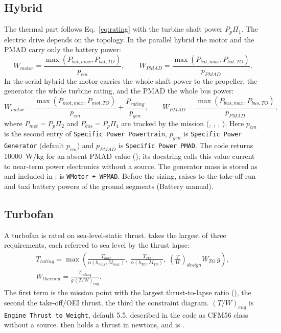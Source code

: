 \documentclass[a4paper,11pt]{article}
\begin{document}
\subsection{Hybrid}
The thermal part follows Eq.~\eqref{eq:rating} with the turbine shaft power $P_p\Pi_1$. The
electric drive depends on the topology. In the parallel hybrid the motor and the PMAD carry
only the battery power:
\begin{equation}
  W_{motor} = \frac{\max(P_{bat,max}, P_{bat,TO})}{p_{em}},\qquad
  W_{PMAD} = \frac{\max(P_{bat,max}, P_{bat,TO})}{p_{PMAD}} .
\end{equation}
In the serial hybrid the motor carries the whole shaft power to the propeller, the generator
the whole turbine rating, and the PMAD the whole bus power:
\begin{equation}
  W_{motor} = \frac{\max(P_{mot,max}, P_{mot,TO})}{p_{em}} + \frac{P_{rating}}{p_{gen}},\qquad
  W_{PMAD} = \frac{\max(P_{bus,max}, P_{bus,TO})}{p_{PMAD}} ,
\end{equation}
where $P_{mot} = P_p\Pi_2$ and $P_{bus} = P_p\Pi_4$ are tracked by the mission
(, , , ). Here $p_{em}$ is the
second entry of \texttt{Specific Power Powertrain}, $p_{gen}$ is \texttt{Specific Power Generator}
(default $p_{em}$) and $p_{PMAD}$ is \texttt{Specific Power PMAD}. The code returns
\SI{10000}{W/kg} for an absent PMAD value (); its docstring calls
this value current to near-term power electronics without a source. The generator mass is
stored as  and included in ;  is
\texttt{WMotor + WPMAD}. Before the sizing,  raises
 to the take-off-run and taxi battery powers of the ground segments (Battery
manual).

\subsection{Turbofan}\label{sec:mass-tf}
A turbofan is rated on sea-level-static thrust.  takes the largest of
three requirements, each referred to sea level by the thrust lapse:
\begin{equation}
\begin{gathered}
  T_{rating} = \max\left(\frac{T_{max}}{\alpha(h_{max}, M_{max})},\;
  \frac{T_{TO}}{\alpha(h_{TO}, M_{TO})},\; \left(\frac{T}{W}\right)_{design} W_{TO}\,g\right),\\
  W_{thermal} = \frac{T_{rating}}{g\,(T/W)_{eng}} .
\end{gathered}
\end{equation}
The first term is the mission point with the largest thrust-to-lapse ratio
(), the second the take-off/OEI thrust, the third the
constraint diagram. $(T/W)_{eng}$ is \texttt{Engine Thrust to Weight}, default 5.5, described
in the code as CFM56 class without a source.  then holds a thrust in
newtons, and  is .
\end{document}
